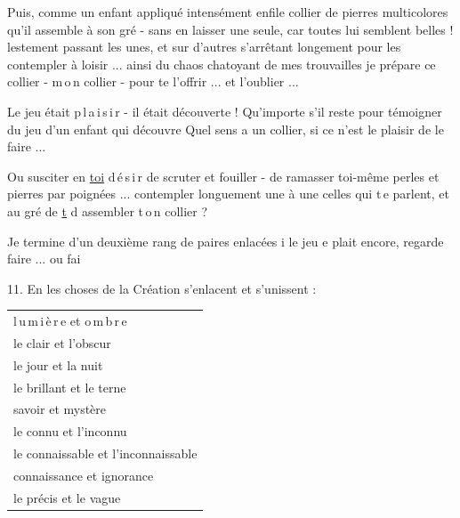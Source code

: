 Puis, comme un enfant appliqué intensément enfile collier de pierres multicolores qu'il assemble à son gré - sans en laisser une seule, car toutes lui semblent belles !  lestement passant les unes, et sur d'autres s'arrêtant longement pour les contempler à loisir ... ainsi du chaos chatoyant de mes trouvailles je prépare ce collier - m\,o\,n collier - pour te l'offrir ... et  l'oublier ...

Le jeu était p\,l\,a\,i\,s\,i\,r - il était découverte ! Qu'importe s'il reste  pour témoigner du jeu  d'un enfant qui découvre  Quel sens a un collier, si ce n'est le plaisir de le faire ...

Ou  susciter en \uline{toi} d\,é\,s\,i\,r de scruter et fouiller - de ramasser toi-même perles et pierres par poignées ... contempler longuement une à une celles qui t\,e parlent, et au gré de  \uline{t} d  assembler t\,o\,n collier ?


Je termine d'un deuxième rang de paires enlacées  i le jeu e plait encore,  regarde faire ... ou  fai   

11. En les choses de la Création s'enlacent et s'unissent :

\begin{tabular}{@{}l@{}}
l\,u\,m\,i\,è\,r\,e \quad et \quad o\,m\,b\,r\,e\\
le clair \quad et l'obscur\\
le jour \quad et la nuit\\
le brillant \quad et le terne\\[.6ex]
savoir \quad et mystère\\
le connu \quad et l'inconnu\\
le connaissable \quad et l'inconnaissable\\
connaissance \quad et ignorance\\[.6ex]
le précis \quad et le vague
\end{tabular}

